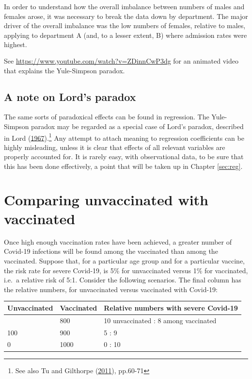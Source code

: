 \documentclass[
  10pt,
  b5paper]{book}
\begin{document}
In order to understand how the overall imbalance between numbers of males and females arose, it was necessary to break the data down by department. The major driver of the overall imbalance was the low numbers of females, relative to males, applying to department A (and, to a lesser extent, B) where admission rates were highest.

See \url{https://www.youtube.com/watch?v=ZDinnCwP3dg} for an animated video that explains the Yule-Simpson paradox.

\hypertarget{a-note-on-lords-paradox}{%
\subsection*{A note on Lord's paradox}\label{a-note-on-lords-paradox}}

The same sorts of paradoxical effects can be found in regression. The Yule-Simpson paradox may be regarded as a special case of Lord's paradox, described in Lord (\protect\hyperlink{ref-lord1967paradox}{1967}).\footnote{See also Tu and Gilthorpe (\protect\hyperlink{ref-tu2011statistical}{2011}), pp.60-71} Any attempt to attach meaning to regression coefficients can be highly misleading, unless it is clear that effects of all relevant variables are properly accounted for. It is rarely easy, with observational data, to be sure that this has been done effectively, a point that will be taken up in Chapter \ref{sec:reg}.

\hypertarget{comparing-unvaccinated-with-vaccinated}{%
\section{Comparing unvaccinated with vaccinated}\label{comparing-unvaccinated-with-vaccinated}}

Once high enough vaccination rates have been achieved, a greater number of Covid-19 infections will be found among the vaccinated than among the vaccinated. Suppose that, for a particular age group and for a particular vaccine, the risk rate for severe Covid-19, is 5\% for unvaccinated versus 1\% for vaccinated, i.e.~a relative risk of 5:1. Consider the following scenarios. The final column has the relative numbers, for unvaccinated versus vaccinated with Covid-19:

\begin{longtable}[]{@{}lll@{}}
\toprule\noalign{}
Unvaccinated & Vaccinated & Relative numbers with severe Covid-19 \\
\midrule\noalign{}
\endhead
\bottomrule\noalign{}
\endlastfoot
200 & 800 & 10 unvaccinated : 8 among vaccinated \\
100 & 900 & 5 : 9 \\
0 & 1000 & 0 : 10 \\
\end{longtable}
\end{document}
